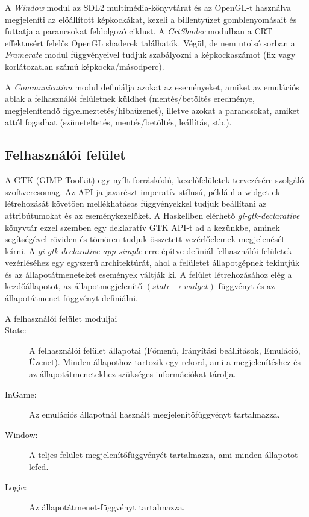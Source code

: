 A \emph{Window} modul az SDL2 multimédia-könyvtárat és az OpenGL-t használva megjeleníti az előállított képkockákat, kezeli a billentyűzet gomblenyomásait és futtatja a parancsokat feldolgozó ciklust. A \emph{CrtShader} modulban a CRT effektusért felelős OpenGL shaderek találhatók.
Végül, de nem utolsó sorban a \emph{Framerate} modul függvényeivel tudjuk szabályozni a képkockaszámot (fix vagy korlátozatlan számú képkocka/másodperc).

A \emph{Communication} modul definiálja azokat az eseményeket, amiket az emulációs ablak a felhasználói felületnek küldhet (mentés/betöltés eredménye, megjelenítendő figyelmeztetés/hibaüzenet), illetve azokat a parancsokat, amiket attól fogadhat (szüneteltetés, mentés/betöltés, leállítás, stb.).

\subsection{Felhasználói felület}

A GTK (GIMP Toolkit) egy nyílt forráskódú, kezelőfelületek tervezésére szolgáló szoftvercsomag.
Az API-ja javarészt imperatív stílusú, például a widget-ek létrehozását követően mellékhatásos függvényekkel tudjuk beállítani az attribútumokat és az eseménykezelőket. A Haskellben elérhető \emph{gi-gtk-declarative} könyvtár ezzel szemben egy deklaratív GTK API-t ad a kezünkbe, aminek segítségével röviden és tömören tudjuk összetett vezérlőelemek megjelenését leírni. 
A \emph{gi-gtk-declarative-app-simple} erre építve definiál felhasználói felületek vezérléséhez egy egyszerű architektúrát, ahol a felületet állapotgépnek tekintjük és az állapotátmeneteket események váltják ki. A felület létrehozásához elég a kezdőállapotot, az állapotmegjelenítő $(state \rightarrow widget)$ függvényt és az állapotátmenet-függvényt definiálni.

\begin{description}
	\item[A felhasználói felület moduljai]
	\item[State:]
	A felhasználói felület állapotai (Főmenü, Irányítási beállítások, Emuláció, Üzenet).
	Minden állapothoz tartozik egy rekord, ami a megjelenítéshez és az állapotátmenetekhez szükséges információkat tárolja.
	\item[InGame:]
	Az emulációs állapotnál használt megjelenítőfüggvényt tartalmazza.
	\item[Window:]
	A teljes felület megjelenítőfüggvényét tartalmazza, ami minden állapotot lefed.
	\item[Logic:]
	Az állapotátmenet-függvényt tartalmazza.
\end{description}

